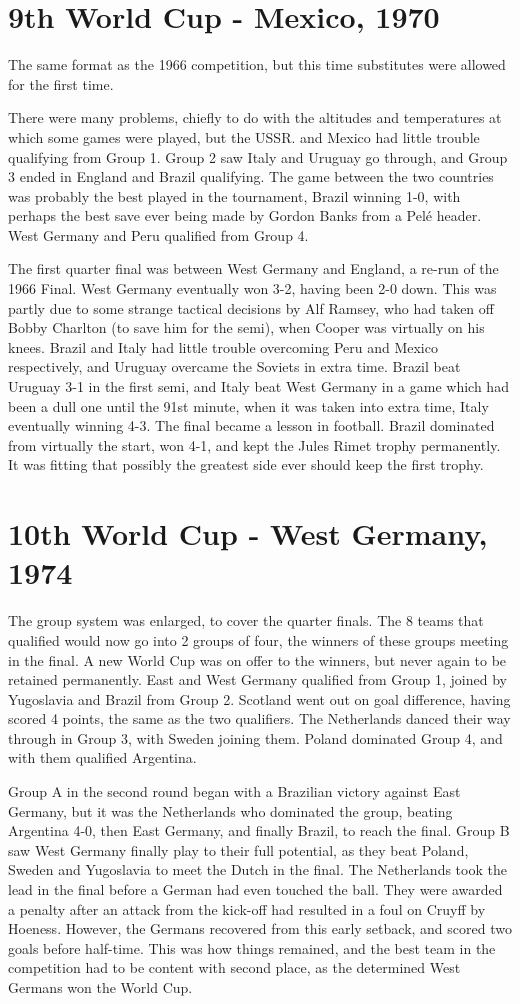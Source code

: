 \section{9th World Cup - Mexico, 1970}
The same format as the 1966 competition, but this time substitutes were 
allowed for the first time.

There were many problems, chiefly to do with the altitudes and temperatures at
which some games were played, but the USSR. and Mexico had little trouble 
qualifying from Group 1. Group 2 saw Italy and Uruguay go through, and Group 3
ended in England and Brazil qualifying. The game between the two countries was
probably the best played in the tournament, Brazil winning 1-0, with perhaps 
the best save ever being made by Gordon Banks from a Pel{\'e} header. West Germany 
and Peru qualified from Group 4.

The first quarter final was between West Germany and England, a re-run of the 
1966 Final. West Germany eventually won 3-2, having been 2-0 down. This was 
partly due to some strange tactical decisions by Alf Ramsey, who had taken off 
Bobby Charlton (to save him for the semi), when Cooper was virtually on his 
knees. Brazil and Italy had little trouble overcoming Peru and Mexico 
respectively, and Uruguay overcame the Soviets in extra time. Brazil beat 
Uruguay 3-1 in the first semi, and Italy beat West Germany in a game which had
been a dull one until the 91st minute, when it was taken into extra time, Italy
eventually winning 4-3. The final became a lesson in football. Brazil dominated
from virtually the start, won 4-1, and kept the Jules Rimet trophy permanently.
It was fitting that possibly the greatest side ever should keep the first 
trophy.
\section{10th World Cup - West Germany, 1974}
The group system was enlarged, to cover the quarter finals. The 8 teams that 
qualified would now go into 2 groups of four, the winners of these groups 
meeting in the final. A new World Cup was on offer to the winners, but never 
again to be retained permanently. East and West Germany qualified from Group 1,
joined by Yugoslavia and Brazil from Group 2. Scotland went out on goal 
difference, having scored 4 points, the same as the two qualifiers. The 
Netherlands danced their way through in Group 3, with Sweden joining them. 
Poland dominated Group 4, and with them qualified Argentina.

Group A in the second round began with a Brazilian victory against East 
Germany, but it was the Netherlands who dominated the group, beating Argentina 
4-0, then East Germany, and finally Brazil, to reach the final. Group B saw 
West Germany finally play to their full potential, as they beat Poland, Sweden
and Yugoslavia to meet the Dutch in the final. The Netherlands took the lead 
in the final before a German had even touched the ball. They were awarded a 
penalty after an attack from the kick-off had resulted in a foul on Cruyff by 
Hoeness. However, the Germans recovered from this early setback, and scored two
goals before half-time. This was how things remained, and the best team in the 
competition had to be content with second place, as the determined West 
Germans won the World Cup.
